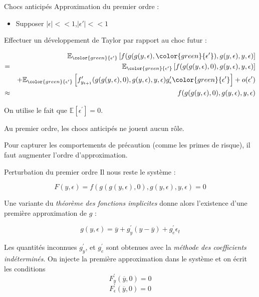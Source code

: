 \documentclass[
  ignorenonframetext,
]{beamer}
\providecommand{\tightlist}{%
  \setlength{\itemsep}{0pt}\setlength{\parskip}{0pt}}
\begin{document}
\begin{frame}{Chocs anticipés}
\label{chocs-anticipuxe9s}
Approximation du premier ordre :

\begin{itemize}
\tightlist
\item
  Supposer \(|\epsilon|<<1\),\(|\epsilon'|<<1\)
\end{itemize}

Effectuer un développement de Taylor par rapport au choc futur :

\begin{align}
 & & \mathbb{E}_{\color{green}{\epsilon'}} \left[ f(g(g(y,\epsilon),\color{green}{\epsilon'}), g(y,\epsilon), y, \epsilon) \right]  \\
= & &  \mathbb{E}_{\color{green}{\epsilon'}}\left[ f(g(g(y,\epsilon),0), g(y,\epsilon), y, \epsilon) \right] \\ 
  & & +  \mathbb{E}_{\color{green}{\epsilon'}} \left[ f^{\prime}_{y_{t+1}}(g(g(y,\epsilon),0), g(y,\epsilon), y, \epsilon) g^{\prime}_{\epsilon} \color{green}{\epsilon'}\right] + o(\epsilon^{\prime}) \\
\approx & & f(g(g(y,\epsilon),0), g(y,\epsilon), y, \epsilon)
\end{align}

\pause

On utilise le fait que
\(\mathbb{E}\left[ \epsilon^{\prime}\right] = 0\).

Au premier ordre, les chocs anticipés ne jouent aucun rôle.

Pour capturer les comportements de précaution (comme les primes de
risque), il faut augmenter l'ordre d'approximation.
\end{frame}

\begin{frame}{Perturbation du premier ordre}
\label{perturbation-du-premier-ordre}
Il nous reste le système :

\[F(y,\epsilon) = f(g(g(y,\epsilon),0), g(y,\epsilon), y, \epsilon) = 0\]

Une variante du \emph{théorème des fonctions implicites} donne alors
l'existence d'une première approximation de \(g\) :

\[g(y,\epsilon) = \overline{y} + g^{\prime}_{y} (y-\overline{y}) + g^{\prime}_e \epsilon_t \]

\pause

Les quantités inconnues \(g^{\prime}_y\), et \(g^{\prime}_e\) sont
obtenues avec la \emph{méthode des coefficients indéterminés}. On
injecte la première approximation dans le système et on écrit les
conditions \[F^{\prime}_y(\overline{y}, 0) = 0\]
\[F^{\prime}_\epsilon(\overline{y}, 0) = 0\]
\end{frame}
\end{document}
